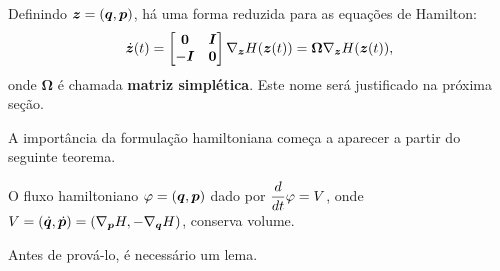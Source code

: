 Definindo $\bm z = (\bm q, \bm p)$, há uma forma reduzida para as equações de Hamilton:
\begin{equation*}
    \dot {\bm z}(t) = \begin{bmatrix}
        \bm 0 & \bm I \\ - \bm I & \bm 0
    \end{bmatrix}
    \nabla_{\bm z} H(\bm z(t))
    = \bm \Omega \nabla_{\bm z} H(\bm z(t)),
\end{equation*}
onde $\bm \Omega$ é chamada \textbf{matriz simplética}. Este nome será justificado na próxima seção.

A importância da formulação hamiltoniana começa a aparecer a partir do seguinte teorema.

\begin{theorem}\label{teorema:hamiltoniano_volume}
    O fluxo hamiltoniano $\varphi = (\bm q, \bm p)$ dado por $\dfrac{d }{d t} \varphi = V$, onde $V = (\dot {\bm q}, \dot {\bm p}) = (\nabla_{\bm p} H, - \nabla_{\bm q} H)$, conserva volume.
\end{theorem}

Antes de prová-lo, é necessário um lema.

